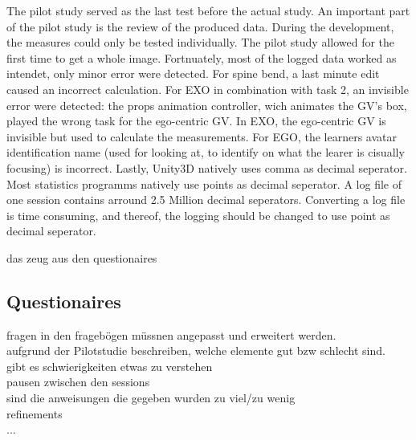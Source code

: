 The pilot study served as the last test before the actual study. An important part of the pilot study is the review of the produced data. During the development, the measures could only be tested individually. The pilot study allowed for the first time to get a whole image. Fortnuately, most of the logged data worked as intendet, only minor error were detected. For spine bend, a last minute edit caused an incorrect calculation. For EXO in combination with task 2, an invisible error were detected: the props animation controller, wich animates the GV's box, played the wrong task for the ego-centric GV. In EXO, the ego-centric GV is invisible but used to calculate the measurements. For EGO, the learners avatar identification name (used for looking at, to identify on what the learer is cisually focusing) is incorrect. Lastly, Unity3D natively uses comma as decimal seperator. Most statistics programms natively use points as decimal seperator. A log file of one session contains arround 2.5 Million decimal seperators. Converting a log file is time consuming, and thereof, the logging should be changed to use point as decimal seperator.

das zeug aus den questionaires
\subsection{Questionaires}
fragen in den fragebögen müssnen angepasst und erweitert werden.\\

aufgrund der Pilotstudie beschreiben, welche elemente gut bzw schlecht sind.\\

gibt es schwierigkeiten etwas zu verstehen\\

pausen zwischen den sessions\\
sind die anweisungen die gegeben wurden zu viel/zu wenig\\
refinements\\
...\\

